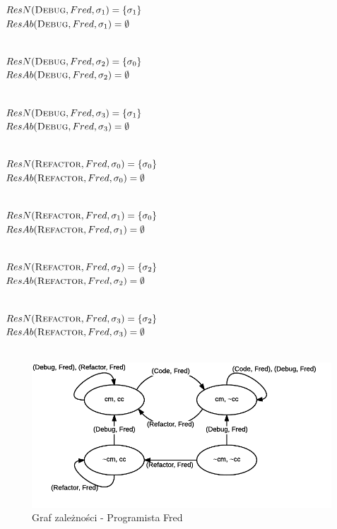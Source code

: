 \documentclass{article}
\begin{document}
\begin{minipage}[t]{0.5\textwidth}
$ResN(\textsc{Debug},Fred,\sigma_{1}) = \{\sigma_{1}\}$\\
$ResAb(\textsc{Debug},Fred,\sigma_{1}) = \emptyset$\\\

$ResN(\textsc{Debug},Fred,\sigma_{2}) = \{\sigma_{0}\}$\\
$ResAb(\textsc{Debug},Fred,\sigma_{2}) = \emptyset$\\\

$ResN(\textsc{Debug},Fred,\sigma_{3}) = \{\sigma_{1}\}$\\
$ResAb(\textsc{Debug},Fred,\sigma_{3}) = \emptyset$\\\

$ResN(\textsc{Refactor},Fred,\sigma_{0}) = \{\sigma_{0}\}$\\
$ResAb(\textsc{Refactor},Fred,\sigma_{0}) = \emptyset$\\\

$ResN(\textsc{Refactor},Fred,\sigma_{1}) = \{\sigma_{0}\}$\\
$ResAb(\textsc{Refactor},Fred,\sigma_{1}) = \emptyset$\\\

$ResN(\textsc{Refactor},Fred,\sigma_{2}) = \{\sigma_{2}\}$\\
$ResAb(\textsc{Refactor},Fred,\sigma_{2}) = \emptyset$\\\

$ResN(\textsc{Refactor},Fred,\sigma_{3}) = \{\sigma_{2}\}$\\
$ResAb(\textsc{Refactor},Fred,\sigma_{3}) = \emptyset$\\\\
\end{minipage}
\begin{figure}[H]
\centering
\includegraphics[scale=1]{Programmers}
\caption{Graf zależności - Programista Fred}
\end{figure}
\newpage
\end{document}

